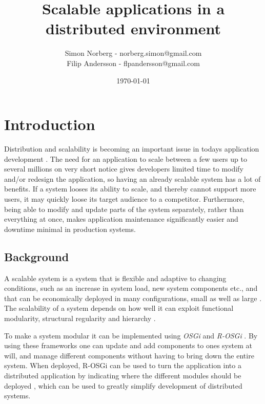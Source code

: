 \documentclass{article}
\begin{document}
 
\title{Scalable applications in a distributed environment}
\author{Simon Norberg - norberg.simon@gmail.com\\
        Filip Andersson - flpandersson@gmail.com }
\date{\today}
\maketitle
 
 
\section{Introduction}

Distribution and scalability is becoming an important issue in todays
application development \cite{rellermeyer2007services}.
The need for an application to scale between a few users up to several millions 
on very short notice gives developers limited time to modify and/or redesign 
the application, so having an already scalable system has a lot of benefits. 
If a system looses its ability to scale, and thereby cannot support more users, 
it may quickly loose its target audience to a competitor. Furthermore, being able 
to modify and update parts of the system separately, rather than everything at 
once, makes application maintenance significantly easier and downtime minimal 
in production systems.

\subsection{Background}

A scalable system is a system that is flexible and adaptive to changing
conditions, such as an increase in system load, new system components etc., and
that can be economically deployed in many configurations, small as well as
large \cite{jogalekar2000evaluating}. The scalability of a system depends on
how well it can exploit functional modularity, structural regularity and
hierarchy \cite{lipson2007principles}.

To make a system modular it can be implemented using \emph{OSGi} and
\emph{R-OSGi} \cite{rellermeyer2007services} \cite{marples2001open}. By using these frameworks one can
update and add components to ones system at will, and manage different
components without having to bring down the entire system. When deployed,
R-OSGi can be used to turn the application into a distributed application by
indicating where the different modules should be deployed
\cite{rellermeyer2007r}, which can be used to greatly simplify development of
distributed systems.
\end{document}
